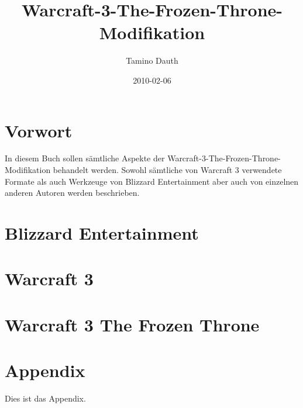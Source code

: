 \documentclass[12pt,german,a5paper,twoside,titlepage,openright,onecolumn]{book}
\begin{document}
	\title{Warcraft-3-The-Frozen-Throne-Modifikation}
	\author{Tamino Dauth}
	\date{2010-02-06}
	\maketitle

	\chapter{Vorwort}
	In diesem Buch sollen sämtliche Aspekte der Warcraft-3-The-Frozen-Throne-Modifikation behandelt werden. Sowohl sämtliche von Warcraft 3 verwendete Formate als auch Werkzeuge von Blizzard Entertainment aber auch von einzelnen anderen Autoren werden beschrieben.

	\chapter{Blizzard Entertainment}

	\chapter{Warcraft 3}

	\chapter{Warcraft 3 The Frozen Throne}

	
	
	

	\appendix
	\chapter{Appendix}
	Dies ist das Appendix.
\end{document}
